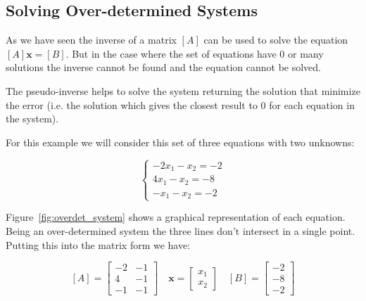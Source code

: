 \subsection{Solving Over-determined Systems}
\label{using-the-pseudoinverse-to-solve-a-overdetermined-system-of-linear-equations}

As we have seen the inverse of a matrix \([A]\) can be used to solve the equation \([A]\mathbf{x}=[B]\). But in the case where the set of equations have 0 or many solutions the inverse cannot be found and the equation cannot be solved. 

The pseudo-inverse helps to solve the system returning the solution that minimize the error (i.e. the solution which gives the closest result to 
0 for each equation in the system). 

For this example we will consider this set of three equations with two
unknowns:

\[
\begin{cases}
−2x_1−x_2=−2 \\
4x_1−x_2=−8 \\
−x_1−x_2=−2 
\end{cases}\]


Figure~\ref{fig:overdet_system} shows a graphical representation of each equation. Being an over-determined system the three lines don't intersect in a single point. Putting this into the matrix form we have:

\[[A]=\begin{bmatrix}
−2&-1\\
4&-1\\
−1&−1\end{bmatrix}\quad 
\mathbf{x}=\begin{bmatrix}
x_1\\
x_2\end{bmatrix}\quad
[B]=\begin{bmatrix}
−2\\
−8\\
−2\end{bmatrix}\]


